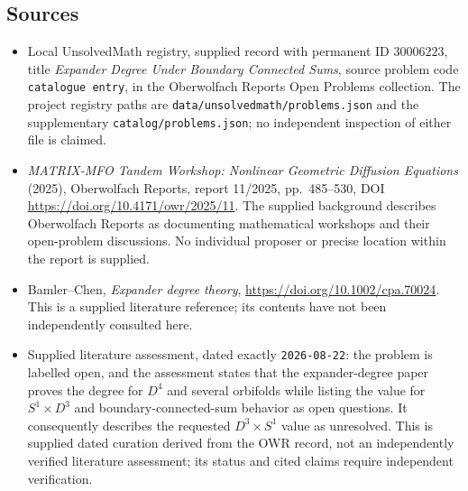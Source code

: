 \documentclass[11pt]{article}
\begin{document}
\subsection{Sources}
\begin{itemize}
\item Local UnsolvedMath registry, supplied record with permanent ID \(30006223\), title \emph{Expander Degree Under Boundary Connected Sums}, source problem code \texttt{catalogue entry}, in the Oberwolfach Reports Open Problems collection. The project registry paths are \texttt{data/unsolvedmath/problems.json} and the supplementary \texttt{catalog/problems.json}; no independent inspection of either file is claimed.
\item \emph{MATRIX-MFO Tandem Workshop: Nonlinear Geometric Diffusion Equations} (2025), Oberwolfach Reports, report 11/2025, pp.~485--530, DOI \url{https://doi.org/10.4171/owr/2025/11}. The supplied background describes Oberwolfach Reports as documenting mathematical workshops and their open-problem discussions. No individual proposer or precise location within the report is supplied.
\item Bamler--Chen, \emph{Expander degree theory}, \url{https://doi.org/10.1002/cpa.70024}. This is a supplied literature reference; its contents have not been independently consulted here.
\item Supplied literature assessment, dated exactly \texttt{2026-08-22}: the problem is labelled open, and the assessment states that the expander-degree paper proves the degree for \(D^4\) and several orbifolds while listing the value for \(S^1\times D^3\) and boundary-connected-sum behavior as open questions. It consequently describes the requested \(D^3\times S^1\) value as unresolved. This is supplied dated curation derived from the OWR record, not an independently verified literature assessment; its status and cited claims require independent verification.
\end{itemize}
\end{document}
